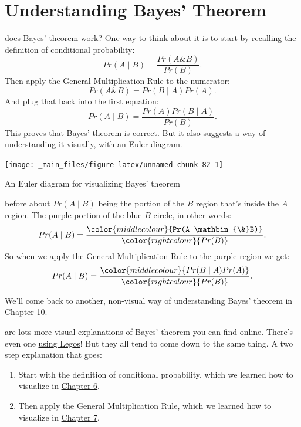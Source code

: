 \documentclass[justified]{tufte-book}
\providecommand{\tightlist}{%
  \setlength{\itemsep}{0pt}\setlength{\parskip}{0pt}}
\newcommand{\given}{\mid}
\renewcommand{\wedge}{\mathbin{\&}}
\newcommand{\p}{Pr}
\theoremstyle{definition}
\theoremstyle{definition}
\theoremstyle{definition}
\theoremstyle{remark}
\begin{document}
\hypertarget{understanding-bayes-theorem}{%
\section{Understanding Bayes'
Theorem}\label{understanding-bayes-theorem}}

 does Bayes' theorem work? One way to think about it is
to start by recalling the definition of conditional probability:
\[ \p(A \given B) = \frac{\p(A \wedge B)}{\p(B)}. \] Then apply the
General Multiplication Rule to the numerator:
\[ \p(A \wedge B) = \p(B \given A)\p(A).\] And plug that back into the
first equation:
\[ \p(A \given B) = \frac{\p(A) \p(B \given A)}{\p(B)}. \] This proves
that Bayes' theorem is correct. But it also suggests a way of
understanding it visually, with an Euler diagram.

\begin{marginfigure}
\texttt{[image: \_main\_files/figure-latex/unnamed-chunk-82-1]} \caption[An Euler diagram for visualizing Bayes' theorem]{An Euler diagram for visualizing Bayes' theorem}\label{fig:unnamed-chunk-82}
\end{marginfigure}

 before about \(\p(A \given B)\) being the
portion of the \(B\) region that's inside the \(A\) region. The purple
portion of the blue \(B\) circle, in other words: \[
  \begin{aligned}
    \p(A \given B) &= \frac{ \color{middlecolour}{\p(A \wedge B)} }{ \color{rightcolour}{\p(B)} }.\\
  \end{aligned}
\] So when we apply the General Multiplication Rule to the purple region
we get: \[
  \begin{aligned}
    \p(A \given B) &= \frac{ \color{middlecolour}{\p(B \given A)\p(A)} }{ \color{rightcolour}{\p(B)} }.\\
  \end{aligned}
\]

We'll come back to another, non-visual way of understanding Bayes'
theorem in \protect\hyperlink{bayesibe}{Chapter 10}.

 are lots more visual explanations of Bayes' theorem
you can find online. There's even one
\href{https://www.countbayesie.com/blog/2015/2/18/bayes-theorem-with-lego}{using
Legos}! But they all tend to come down to the same thing. A two step
explanation that goes:

\begin{enumerate}
\def\labelenumi{\arabic{enumi}.}
\tightlist
\item
  Start with the definition of conditional probability, which we learned
  how to visualize in
  \protect\hyperlink{calculating-conditional-probability}{Chapter 6}.
\item
  Then apply the General Multiplication Rule, which we learned how to
  visualize in
  \protect\hyperlink{the-general-multiplication-rule}{Chapter 7}.
\end{enumerate}
\end{document}
